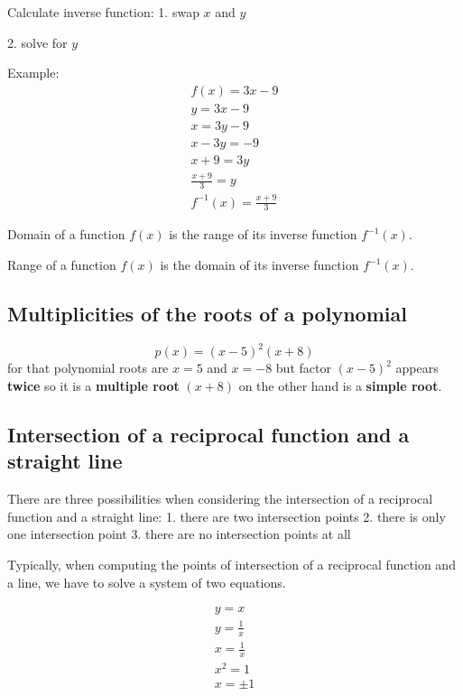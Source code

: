 \documentclass{article}
\begin{document}
Calculate inverse function:
1. swap $x$ and $y$

2. solve for $y$

Example:
\begin{equation}
  \begin{gathered}
    f(x) = 3x-9 \\
    y = 3x-9 \\
    x = 3y-9 \\
    x-3y=-9 \\
    x+9=3y \\
    \frac{x+9}{3}=y \\
    f^{-1}(x)=\frac{x+9}{3}
  \end{gathered}
\end{equation}

Domain of a function $f(x)$ is the range of its inverse function $f^{-1}(x)$.

Range of a function $f(x)$ is the domain of its inverse function $f^{-1}(x)$.

\subsection{Multiplicities of the roots of a polynomial}
\begin{equation}
  p(x) = (x-5)^2(x+8)
\end{equation}
for that polynomial roots are $x=5$ and $x=-8$ but factor $(x-5)^2$
appears \textbf{twice} so it is a \textbf{multiple root}
$(x+8)$ on the other hand is a \textbf{simple root}.

\subsection{Intersection of a reciprocal function and a straight line}
There are three possibilities when considering the intersection of a reciprocal
function and a straight line:
1. there are two intersection points
2. there is only one intersection point
3. there are no intersection points at all


Typically, when computing the points of intersection of a reciprocal
function and a line, we have to solve a system of two equations.

\begin{equation}
  \begin{gathered}
    y = x \\
    y = \frac{1}{x} \\
    x = \frac{1}{x} \\
    x^2 = 1 \\
    x = \pm 1
  \end{gathered}
\end{equation}
\end{document}
